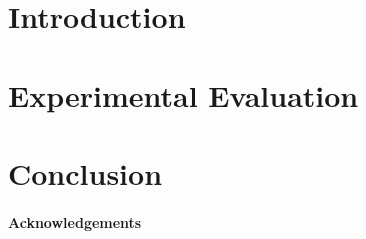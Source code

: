 



\maketitle
\thispagestyle{empty}

\begin{abstract}
    
\end{abstract}


\section{Introduction}




\section{Experimental Evaluation}



\section{Conclusion}


\paragraph{Acknowledgements}



{\small


}

 
